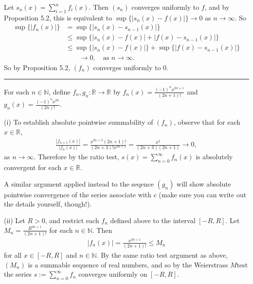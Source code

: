 \documentclass[letterpaper,10pt,english]{jupyterBook}
\begin{document}
\sphinxAtStartPar
{\hyperref[\detokenize{Problems:id60}]{}} Let \(s_n(x)=\sum_{i=1}^n f_i(x)\). Then \((s_n)\) converges uniformly to \(f\), and by Proposition 5.2, this is equivalent to \(\sup\{|s_n(x)-f(x)|\}\to 0\) as \(n\to\infty\). So
\begin{align*}
\sup\{|f_n(x)|\}&=\sup\{|s_n(x)-s_{n-1}(x)|\}\\
&\leq \sup \{|s_n(x)-f(x)|+|f(x)-s_{n-1}(x)|\}\\
&\leq \sup \{|s_n(x)-f(x)|\}+\sup\{|f(x)-s_{n-1}(x)|\}\\
&\qquad\to 0, \quad\text{as $n\to\infty$.}
\end{align*}
\sphinxAtStartPar
So by Proposition 5.2, \((f_n)\) converges uniformly to \(0\).


\bigskip\hrule\bigskip


\sphinxAtStartPar
{\hyperref[\detokenize{Problems:id61}]{}} For each \(n\in\mathbb{N}\), define \(f_n,g_n:\mathbb{R}\to\mathbb{R}\) by \(f_n(x)=\frac{(-1)^nx^{2n+1}}{(2n+1)!}\) and \(g_n(x)=\frac{(-1)^nx^{2n}}{(2n)!}\).

\sphinxAtStartPar
(i) To establish absolute pointwise summability of \((f_n)\), observe that for each  \(x\in\mathbb{R}\),
\begin{equation*}
\begin{split}
\frac{|f_{n+1}(x)|}{|f_n(x)|} = \frac{x^{2n+3}(2n+1)!}{(2n+3)!x^{2n+1}} = \frac{x^2}{(2n+3)(2n+1)} \rightarrow 0,
\end{split}
\end{equation*}
\sphinxAtStartPar
as \(n\rightarrow\infty\). Therefore by the ratio test, \(s(x) = \sum_{n=0}^\infty f_n(x)\) is absolutely convergent for each \(x\in\mathbb{R}\).

\sphinxAtStartPar
A similar argument applied instead to the seqence \((g_n)\) will show absolute pointwise convergence of the series associate with \(c\) (make sure you can write out the details yourself, though!).

\sphinxAtStartPar
(ii) Let \(R>0\), and restrict each \(f_n\) defined above to the interval \([-R,R]\). Let \(M_n=\frac{R^{2n+1}}{(2n+1)!}\) for each \(n\in\mathbb{N}\). Then
\begin{equation*}
\begin{split}
|f_n(x)| = \frac{x^{2n+1}}{(2n+1)!} \leq M_n
\end{split}
\end{equation*}
\sphinxAtStartPar
for all \(x\in[-R,R]\) and \(n\in\mathbb{N}\). By the same ratio test argument as above, \((M_n)\) is a summable sequence of real numbers, and so by the Weierstrass \(M\)\sphinxhyphen{}test the series \(s:=\sum_{n=0}^\infty f_n\) converges uniformly on \([-R,R]\).
\end{document}
